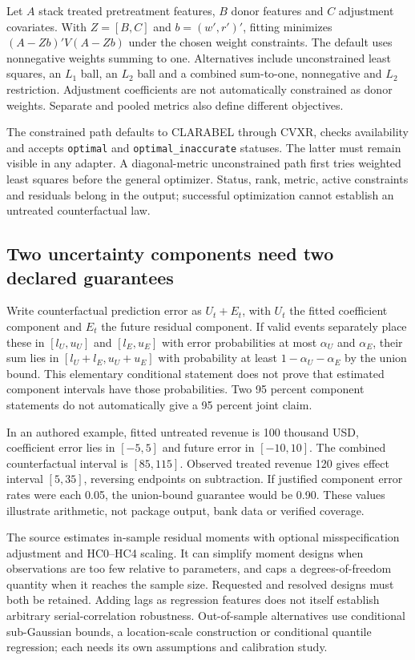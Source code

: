 Let $A$ stack treated pretreatment features, $B$ donor features and $C$
adjustment covariates. With $Z=[B,C]$ and $b=(w',r')'$, fitting minimizes
$(A-Zb)'V(A-Zb)$ under the chosen weight constraints. The default uses
nonnegative weights summing to one. Alternatives include unconstrained
least squares, an $L_1$ ball, an $L_2$ ball and a combined sum-to-one,
nonnegative and $L_2$ restriction. Adjustment coefficients are not
automatically constrained as donor weights. Separate and pooled metrics
also define different objectives.\citep{exec24_scpi_source}

The constrained path defaults to CLARABEL through CVXR, checks availability
and accepts \texttt{optimal} and \texttt{optimal\_inaccurate} statuses. The
latter must remain visible in any adapter. A diagonal-metric unconstrained
path first tries weighted least squares before the general optimizer.
Status, rank, metric, active constraints and residuals belong in the output;
successful optimization cannot establish an untreated counterfactual law.
\citep{exec24_scpi_source,exec24_scpi_choice}

\subsection{Two uncertainty components need two declared guarantees}
Write counterfactual prediction error as $U_t+E_t$, with $U_t$ the fitted
coefficient component and $E_t$ the future residual component. If valid
events separately place these in $[l_U,u_U]$ and $[l_E,u_E]$ with error
probabilities at most $\alpha_U$ and $\alpha_E$, their sum lies in
$[l_U+l_E,u_U+u_E]$ with probability at least $1-\alpha_U-\alpha_E$ by
the union bound. This elementary conditional statement does not prove that
estimated component intervals have those probabilities. Two 95 percent
component statements do not automatically give a 95 percent joint claim.
\citep{exec24_scpi_choice}

In an authored example, fitted untreated revenue is 100 thousand USD,
coefficient error lies in $[-5,5]$ and future error in $[-10,10]$. The
combined counterfactual interval is $[85,115]$. Observed treated revenue
120 gives effect interval $[5,35]$, reversing endpoints on subtraction.
If justified component error rates were each 0.05, the union-bound
guarantee would be 0.90. These values illustrate arithmetic, not package
output, bank data or verified coverage.\citep{exec24_scpi_choice}

The source estimates in-sample residual moments with optional
misspecification adjustment and HC0--HC4 scaling. It can simplify moment
designs when observations are too few relative to parameters, and caps a
degrees-of-freedom quantity when it reaches the sample size. Requested and
resolved designs must both be retained. Adding lags as regression features
does not itself establish arbitrary serial-correlation robustness.
Out-of-sample alternatives use conditional sub-Gaussian bounds, a
location-scale construction or conditional quantile regression; each needs
its own assumptions and calibration study.\citep{exec24_scpi_source}

